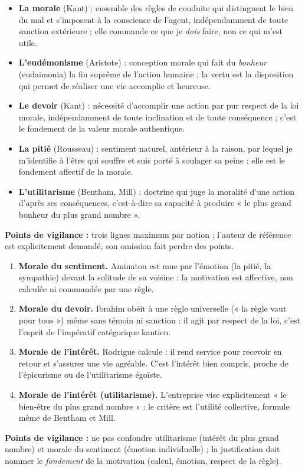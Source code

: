\documentclass[11pt]{article}
\begin{document}
\begin{corrige}
\begin{itemize}
\item \textbf{La morale} (Kant) : ensemble des règles de conduite qui distinguent le bien du mal et s'imposent à la conscience de l'agent, indépendamment de toute sanction extérieure ; elle commande ce que je \emph{dois} faire, non ce qui m'est utile.
\item \textbf{L'eudémonisme} (Aristote) : conception morale qui fait du \emph{bonheur} (eudaimonia) la fin suprême de l'action humaine ; la vertu est la disposition qui permet de réaliser une vie accomplie et heureuse.
\item \textbf{Le devoir} (Kant) : nécessité d'accomplir une action par pur respect de la loi morale, indépendamment de toute inclination et de toute conséquence ; c'est le fondement de la valeur morale authentique.
\item \textbf{La pitié} (Rousseau) : sentiment naturel, antérieur à la raison, par lequel je m'identifie à l'être qui souffre et suis porté à soulager sa peine ; elle est le fondement affectif de la morale.
\item \textbf{L'utilitarisme} (Bentham, Mill) : doctrine qui juge la moralité d'une action d'après ses conséquences, c'est-à-dire sa capacité à produire « le plus grand bonheur du plus grand nombre ».
\end{itemize}
\textbf{Points de vigilance :} trois lignes maximum par notion ; l'auteur de référence est explicitement demandé, son omission fait perdre des points.
\end{corrige}

\begin{corrige}
\begin{enumerate}
\item \textbf{Morale du sentiment.} Aminatou est mue par l'émotion (la pitié, la sympathie) devant la solitude de sa voisine : la motivation est affective, non calculée ni commandée par une règle.
\item \textbf{Morale du devoir.} Ibrahim obéit à une règle universelle (« la règle vaut pour tous ») même sans témoin ni sanction : il agit par respect de la loi, c'est l'esprit de l'impératif catégorique kantien.
\item \textbf{Morale de l'intérêt.} Rodrigue calcule : il rend service pour recevoir en retour et s'assurer une vie agréable. C'est l'intérêt bien compris, proche de l'épicurisme ou de l'utilitarisme égoïste.
\item \textbf{Morale de l'intérêt (utilitarisme).} L'entreprise vise explicitement « le bien-être du plus grand nombre » : le critère est l'utilité collective, formule même de Bentham et Mill.
\end{enumerate}
\textbf{Points de vigilance :} ne pas confondre utilitarisme (intérêt du plus grand nombre) et morale du sentiment (émotion individuelle) ; la justification doit nommer le \emph{fondement} de la motivation (calcul, émotion, respect de la règle).
\end{corrige}
\end{document}

